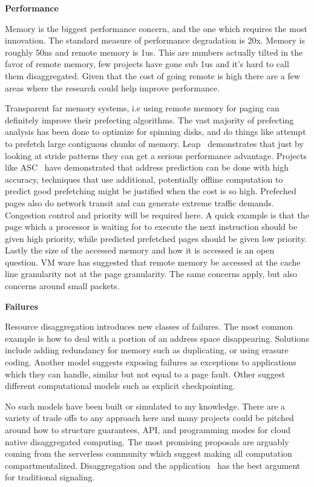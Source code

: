 \textbf{Performance}

Memory is the biggest performance concern, and the one which requires the most
innovation. The standard measure of performance degradation is 20x. Memory is
roughly 50ns and remote memory is 1us. This are numbers actually tilted in the
favor of remote memory, few projects have gone sub 1us and it's hard to call
them disaggregated. Given that the cost of going remote is high there are a few
areas where the research could help improve performance.

Transparent far memory systems, i.e using remote memory for paging can definitely
improve their prefecting algorithms. The vast majority of prefecting analysis
has been done to optimize for spinning disks, and do things like attempt to
prefetch large contiguous chunks of memory. Leap~\cite{leap} demonstrates that
just by looking at stride patterns they can get a serious performance advantage.
Projects like ASC~\cite{asc} have demonstrated that address prediction can be
done with high accuracy, techniques that use additional, potentially offline
computation to predict good prefetching might be justified when the cost is so
high. Prefeched pages also do network transit and can generate extreme traffic
demands. Congestion control and priority will be required here. A quick example
is that the page which a processor is waiting for to execute the next
instruction should be given high priority, while predicted prefetched pages
should be given low priority. Lastly the size of the accessed memory and how it
is accessed is an open question. VM ware has suggested that remote memory be
accessed at the cache line granularity not at the page granularity. The same
concerns apply, but also concerns around small packets.



\textbf{Failures}

Resource disaggregation introduces new classes of failures. The most common
example is how to deal with a portion of an address space disappearing.
Solutions include adding redundancy for memory such as duplicating, or using
erasure coding. Another model suggests exposing failures as exceptions to
applications which they can handle, similar but not equal to a page fault. Other
suggest different computational models such as explicit checkpointing. 

No such models have been built or simulated to my knowledge. There are a variety
of trade offs to any approach here and many projects could be pitched around how
to structure guarantees, API, and programming modes for cloud native
disaggregated computing. The most promising proposals are arguably coming from
the serverless community which suggest making all computation compartmentalized.
Disaggregation and the application~\cite{ddcaps} has the best argument for
traditional signaling.

